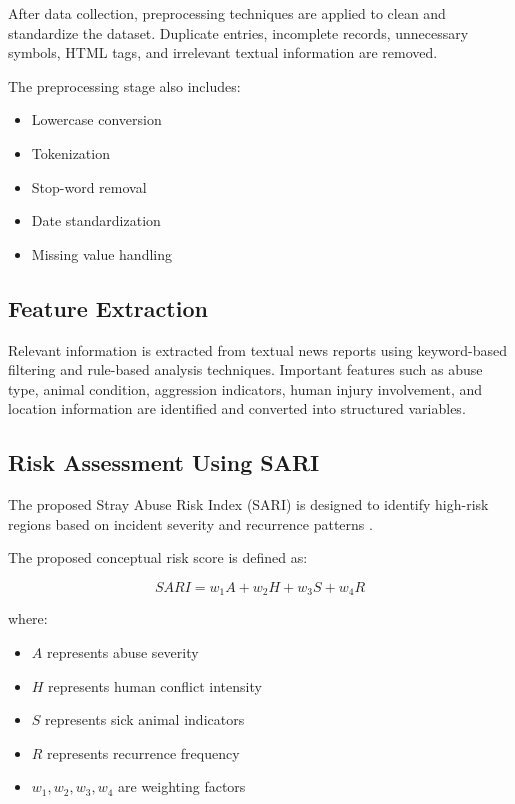 \documentclass[conference]{IEEEtran}
\begin{document}
After data collection, preprocessing techniques are applied to clean and standardize the dataset. Duplicate entries, incomplete records, unnecessary symbols, HTML tags, and irrelevant textual information are removed.

The preprocessing stage also includes:
\begin{itemize}
    \item Lowercase conversion
    \item Tokenization
    \item Stop-word removal
    \item Date standardization
    \item Missing value handling
\end{itemize}

\subsection{Feature Extraction}

Relevant information is extracted from textual news reports using keyword-based filtering and rule-based analysis techniques. Important features such as abuse type, animal condition, aggression indicators, human injury involvement, and location information are identified and converted into structured variables.

\subsection{Risk Assessment Using SARI}

The proposed Stray Abuse Risk Index (SARI) is designed to identify high-risk regions based on incident severity and recurrence patterns \cite{chen2022,garcia2021,kumar2021,fernandez2023}.

The proposed conceptual risk score is defined as:

\[
SARI = w_1A + w_2H + w_3S + w_4R
\]

where:

\begin{itemize}
    \item \(A\) represents abuse severity
    \item \(H\) represents human conflict intensity
    \item \(S\) represents sick animal indicators
    \item \(R\) represents recurrence frequency
    \item \(w_1, w_2, w_3, w_4\) are weighting factors
\end{itemize}
\end{document}
